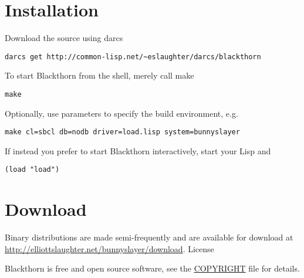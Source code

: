 \documentclass[letterpaper]{article}
\begin{document}
\section{Installation}

Download the source using darcs

\begin{verbatim}
darcs get http://common-lisp.net/~eslaughter/darcs/blackthorn
\end{verbatim}

To start Blackthorn from the shell, merely call make

\begin{verbatim}
make
\end{verbatim}

Optionally, use parameters to specify the build environment, e.g.

\begin{verbatim}
make cl=sbcl db=nodb driver=load.lisp system=bunnyslayer
\end{verbatim}

If instead you prefer to start Blackthorn interactively, start your Lisp and

\begin{verbatim}
(load "load")
\end{verbatim}

\section{Download}

Binary distributions are made semi-frequently and are available for download at \url{http://elliottslaughter.net/bunnyslayer/download}.
License

Blackthorn is free and open source software, see the \href{http://common-lisp.net/~eslaughter/darcs/blackthorn/COPYRIGHT}{COPYRIGHT} file for details.
\end{document}
